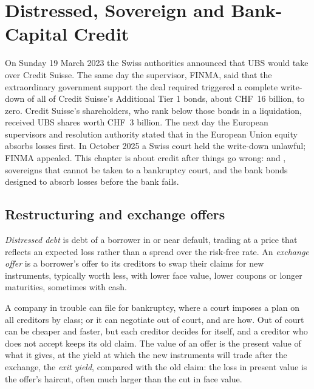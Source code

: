 \chapter{Distressed, Sovereign and Bank-Capital Credit}\label{ch:m2:distressed-sovereign-and-bank-capital-credit}

On Sunday 19 March 2023 the Swiss authorities announced that UBS would take over Credit
Suisse. The same day the supervisor, FINMA, said that the extraordinary government
support the deal required triggered a complete write-down of all of Credit Suisse's
Additional Tier 1 bonds, about CHF~16 billion, to zero. Credit Suisse's shareholders,
who rank below those bonds in a liquidation, received UBS shares worth CHF~3 billion.
The next day the European supervisors and resolution authority stated that in the
European Union equity absorbs losses first. In October 2025 a Swiss court held the
write-down unlawful; FINMA appealed. This chapter is about credit after things go
wrong:  and , sovereigns that cannot be taken to a
bankruptcy court, and the bank bonds designed to absorb losses before the bank fails.

\section{Restructuring and exchange offers}

\begin{definition}\label{def:m2:distressed-sovereign-and-bank-capital-credit:distressed}
\emph{Distressed debt} is debt of a borrower in or near default,
trading at a price that reflects an expected loss rather than a spread over the
risk-free rate. An \emph{exchange offer} is a borrower's offer to
its creditors to swap their claims for new instruments, typically worth less, with
lower face value, lower coupons or longer maturities, sometimes with cash.
\end{definition}

A company in trouble can file for bankruptcy, where a court imposes a plan on all
creditors by class; or it can negotiate out of court, and  are how.
Out of court can be cheaper and faster, but each creditor decides for itself, and a
creditor who does not accept keeps its old claim. The value of an offer is the present
value of what it gives, at the yield at which the new instruments will trade after the
exchange, the \emph{exit yield}, compared with the old claim: the loss in present value
is the offer's haircut, often much larger than the cut in face value.

